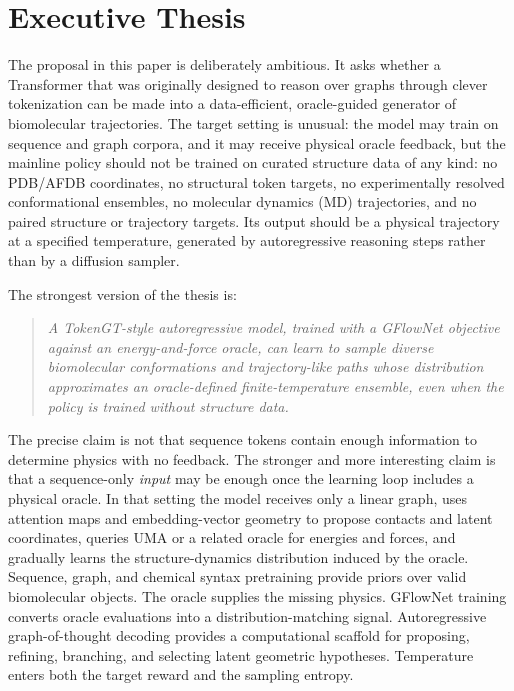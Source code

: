 \documentclass[11pt]{article}
\begin{document}
\tableofcontents
\newpage

\section{Executive Thesis}

The proposal in this paper is deliberately ambitious. It asks whether a Transformer that was originally designed to reason over graphs through clever tokenization can be made into a data-efficient, oracle-guided generator of biomolecular trajectories. The target setting is unusual: the model may train on sequence and graph corpora, and it may receive physical oracle feedback, but the mainline policy should not be trained on curated structure data of any kind: no PDB/AFDB coordinates, no structural token targets, no experimentally resolved conformational ensembles, no molecular dynamics (MD) trajectories, and no paired structure or trajectory targets. Its output should be a physical trajectory at a specified temperature, generated by autoregressive reasoning steps rather than by a diffusion sampler.

The strongest version of the thesis is:
\begin{quote}
\emph{A TokenGT-style autoregressive model, trained with a GFlowNet objective against an energy-and-force oracle, can learn to sample diverse biomolecular conformations and trajectory-like paths whose distribution approximates an oracle-defined finite-temperature ensemble, even when the policy is trained without structure data.}
\end{quote}

The precise claim is not that sequence tokens contain enough information to determine physics with no feedback. The stronger and more interesting claim is that a sequence-only \emph{input} may be enough once the learning loop includes a physical oracle. In that setting the model receives only a linear graph, uses attention maps and embedding-vector geometry to propose contacts and latent coordinates, queries UMA or a related oracle for energies and forces, and gradually learns the structure-dynamics distribution induced by the oracle. Sequence, graph, and chemical syntax pretraining provide priors over valid biomolecular objects. The oracle supplies the missing physics. GFlowNet training converts oracle evaluations into a distribution-matching signal. Autoregressive graph-of-thought decoding provides a computational scaffold for proposing, refining, branching, and selecting latent geometric hypotheses. Temperature enters both the target reward and the sampling entropy.
\end{document}
